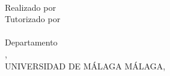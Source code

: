 \vspace*{-10mm}
\hspace*{-10mm}
\begin{minipage}{0.6\textwidth}
  \begin{center}
    \MakeUppercase{\facultad}
    \bigbreak
    \grado
    \bigbreak
    \tituloes \\
    \tituloen
    \bigbreak
    Realizado por \\
    \alumno
    \bigbreak
    Tutorizado por \\
    \tutor \\
    \bigbreak
    Departamento \\
    \departamento,\\
    UNIVERSIDAD DE MÁLAGA
    \bigbreak
    MÁLAGA, \fecha
  \end{center}
\end{minipage}
